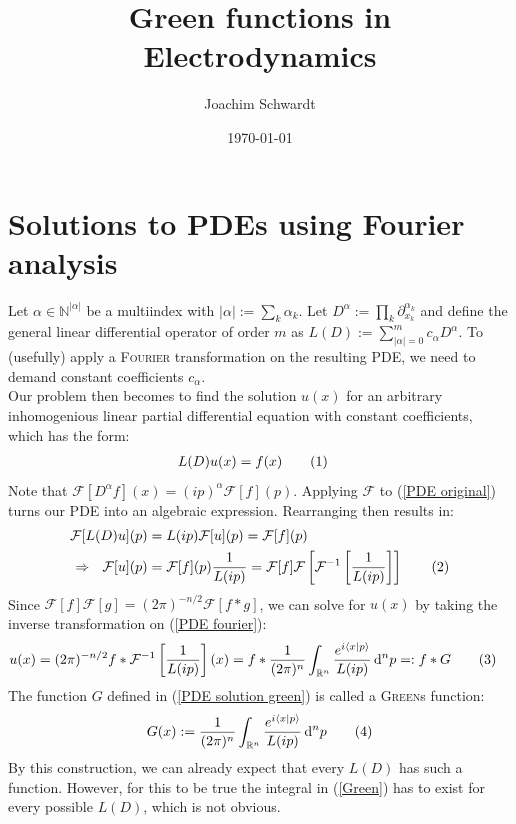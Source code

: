 \documentclass[a4paper,12pt]{article}
\newcommand\numberthis{\addtocounter{equation}{1}\tag{\theequation}}
\newcommand{\brak}{}
\newcommand{\intr}{}
\newcommand{\klam}{}
\begin{document}
\title{Green functions in Electrodynamics}
\author{Joachim Schwardt}
\date{\today}
\maketitle

\section{Solutions to PDEs using Fourier analysis}
Let $\alpha\in\mathbb{N}^{|\alpha|}$ be a multiindex with $|\alpha|:=\sum_k\alpha_k$. Let $D^\alpha:=\prod_k\partial_{x_k}^{\alpha_k}$ and define the general linear differential operator of order $m$ as $L(D):=\sum_{|\alpha|=0}^mc_\alpha D^\alpha$. To (usefully) apply a  \textsc{Fourier} transformation on the resulting PDE, we need to demand constant coefficients $c_\alpha$. \\
Our problem then becomes to find the solution $u(x)$ for an arbitrary inhomogenious linear partial differential equation with constant coefficients, which has the form:
\begin{align*}
L(D)u(x)&=f(x)\numberthis\label{PDE original}
\end{align*}
Note that $\mathcal{F}[D^\alpha f](x)=(ip)^\alpha\mathcal{F}[f](p)$. Applying $\mathcal{F}$ to (\ref{PDE original}) turns our PDE into an algebraic expression. Rearranging then results in:
\begin{align*}
\mathcal{F}[L(D)u](p)&=L(ip)\mathcal{F}[u](p)=\mathcal{F}[f](p)\\
\Rightarrow\ \ \mathcal{F}[u](p)&=\mathcal{F}[f](p)\frac{1}{L(ip)}=\mathcal{F}[f]\mathcal{F}\left[\mathcal{F}^{-1}\klam\left[ {\frac{1}{L(ip)}} \right]\right]\numberthis\label{PDE fourier}
\end{align*}
Since $\mathcal{F}[f]\mathcal{F}[g]=(2\pi)^{-n/2}\mathcal{F}[f\ast g]$, we can solve for $u(x)$ by taking the inverse transformation on (\ref{PDE fourier}):
\begin{align*}
u(x)&=(2\pi)^{-n/2}f\ast\mathcal{F}^{-1}\klam\left[ {\frac{1}{L(ip)}} \right](x)=f\ast\frac{1}{(2\pi)^n}\intr\int_{\mathbb{R}^{n}}{\frac{e^{i\brak\langle {x}| {p}\rangle}}{L(ip)}}\,\mathrm{d}^{n}p=:f\ast G\numberthis\label{PDE solution green}
\end{align*}
The function $G$ defined in (\ref{PDE solution green}) is called a \textsc{Green}s function:
\begin{align*}
G(x):=\frac{1}{(2\pi)^n}\intr\int_{\mathbb{R}^{n}}{\frac{e^{i\brak\langle {x}| {p}\rangle}}{L(ip)}}\,\mathrm{d}^{n}p\numberthis\label{Green}
\end{align*} 
By this construction, we can already expect that every $L(D)$ has such a function. However, for this to be true the integral in (\ref{Green}) has to exist for every possible $L(D)$, which is not obvious. 
\end{document}
